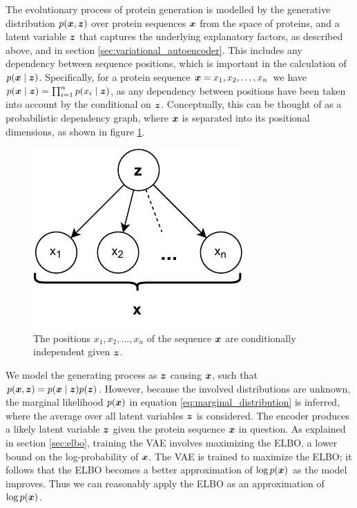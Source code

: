 The evolutionary process of protein generation is modelled by the generative distribution $p(\bm{ x }, \bm{ z })$ over protein sequences $\bm{ x }$ from the space of proteins, and a latent variable $\bm{ z }$ that captures the underlying explanatory factors, as described above, and in section \ref{sec:variational_autoencoder}. This includes any dependency between sequence positions, which is important in the calculation of $p(\bm{ x } \mid \bm{ z })$. Specifically, for a protein sequence $\bm{ x } = x_1, x_2, \ldots, x_n$ we have $p(\bm{ x } \mid \bm{ z }) = \prod_{i = 1}^n p(x_i \mid \bm{ z })$, as any dependency between positions have been taken into account by the conditional on $\bm{ z }$. Conceptually, this can be thought of as a probabilistic dependency graph, where $\bm{ x }$ is separated into its positional dimensions, as shown in figure \ref{fig:codependency}.
\begin{figure}[ht]
    \centering
    \includegraphics{report/figures/codependency.pdf}
    \caption{The positions $x_1, x_2, \ldots, x_n$ of the sequence $\bm{ x }$ are conditionally independent given $\bm{ z }$.}
    \label{fig:codependency}
\end{figure}

We model the generating process as $\bm{ z }$ causing $\bm{ x }$, such that $p{\mathopen{} \left( \bm{ x }, \bm{ z } \right) \mathclose{}} = p(\bm{ x } \mid \bm{ z }) p(\bm{ z })$.
However, because the involved distributions are unknown, the marginal likelihood $p(\bm{ x })$ in equation \ref{eq:marginal_distribution} is inferred, where the average over all latent variables $\bm{ z }$ is considered. The encoder produces a likely latent variable $\bm{ z }$ given the protein sequence $\bm{ x }$ in question. As explained in section \ref{sec:elbo}, training the VAE involves maximizing the ELBO, a lower bound on the log-probability of $\bm{ x }$. The VAE is trained to maximize the ELBO; it follows that the ELBO becomes a better approximation of $\log p(\bm{ x })$ as the model improves. Thus we can reasonably apply the ELBO as an approximation of $\log p(\bm{ x })$.

